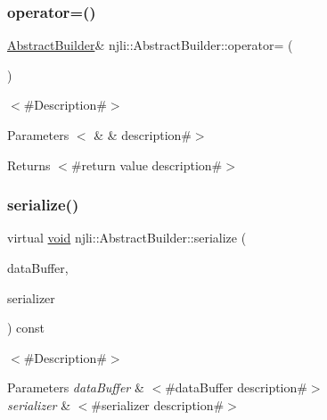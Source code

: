 \subsubsection{\texorpdfstring{operator=()}{operator=()}}
{\footnotesize\ttfamily \mbox{\hyperlink{classnjli_1_1_abstract_builder}{Abstract\+Builder}}\& njli\+::\+Abstract\+Builder\+::operator= (\begin{DoxyParamCaption}\item[{const \mbox{\hyperlink{classnjli_1_1_abstract_builder}{Abstract\+Builder}} \&}]{ }\end{DoxyParamCaption})}

$<$\#\+Description\#$>$


\begin{DoxyParams}[1]{Parameters}
$<$ & {\em } & description\#$>$\\
\hline
\end{DoxyParams}
\begin{DoxyReturn}{Returns}
$<$\#return value description\#$>$ 
\end{DoxyReturn}
\mbox{\label{classnjli_1_1_abstract_builder_ab66b774e02ccb9da554c9aab7fa6d981}} 
\subsubsection{\texorpdfstring{serialize()}{serialize()}}
{\footnotesize\ttfamily virtual \mbox{\hyperlink{_thread_8h_af1e856da2e658414cb2456cb6f7ebc66}{void}} njli\+::\+Abstract\+Builder\+::serialize (\begin{DoxyParamCaption}\item[{\mbox{\hyperlink{_thread_8h_af1e856da2e658414cb2456cb6f7ebc66}{void}} $\ast$}]{data\+Buffer,  }\item[{bt\+Serializer $\ast$}]{serializer }\end{DoxyParamCaption}) const\hspace{0.3cm}{\ttfamily [pure virtual]}}

$<$\#\+Description\#$>$


\begin{DoxyParams}{Parameters}
{\em data\+Buffer} & $<$\#data\+Buffer description\#$>$ \\
\hline
{\em serializer} & $<$\#serializer description\#$>$ \\
\hline
\end{DoxyParams}


